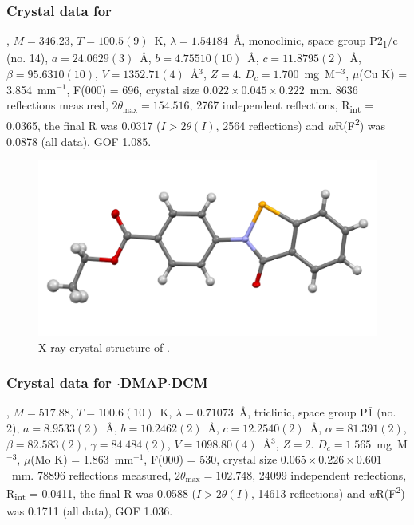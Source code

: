 \begin{refsection}
\subsubsection{Crystal data for \texorpdfstring{}{C16 H13 N O3 Se}}
, $M=346.23$, $T=100.5(9)$~K, $\lambda=1.54184$~\AA, monoclinic, space group P2\textsubscript{1}/c (no. 14), $a = 24.0629(3)$~\AA, $b = 4.75510(10)$~\AA, $c = 11.8795(2)$~\AA, $\beta = 95.6310(10)$\degree, $V = 1352.71(4)$~\AA$^{3}$, $Z = 4$. $D_{c}= 1.700$~mg~M$^{-3}$, $\mu$(Cu K\a) = 3.854~mm$^{-1}$, F(000) = 696, crystal size $0.022 \times 0.045 \times 0.222$~mm. 8636 reflections measured, $2\theta_{\max}=154.516$\degree, 2767 independent reflections, R\textsubscript{int} = 0.0365, the final R was 0.0317 ($I > 2\theta(I)$, 2564 reflections) and \textit{w}R(F\textsuperscript{2}) was 0.0878 (all data), GOF 1.085.

\begin{figure}
  \includegraphics[width=0.6\linewidth]{Figures/ebs-4co2et-xtal.pdf}
  \caption{X-ray crystal structure of \texorpdfstring{}{C16 H13 N O3 Se}.}
\end{figure}

\subsubsection{Crystal data for \texorpdfstring{$ \cdot $DMAP$ \cdot $DCM}{C24 H25 Cl N3 O3 Se}}
, $M=517.88$, $T=100.6(10)$~K, $ \lambda=0.71073 $~\AA, triclinic, space group P$\bar{1}$ (no. 2), $a = 8.9533(2)$~\AA, $b = 10.2462(2)$~\AA, $c = 12.2540(2)$~\AA, $\alpha = 81.391(2)$\degree, $\beta = 82.583(2)$\degree, $\gamma = 84.484(2)$\degree, $V = 1098.80(4)$~\AA$^{3}$, $Z = 2$. $D_{c}= 1.565$~mg~M$^{-3}$, $\mu$(Mo K\a) = 1.863~mm$^{-1}$, F(000) = 530, crystal size $0.065 \times 0.226 \times 0.601$~mm. 78896 reflections measured, $2\theta_{\max}=102.748$\degree, 24099 independent reflections, R\textsubscript{int} = 0.0411, the final R was 0.0588 ($I > 2\theta(I)$, 14613 reflections) and \textit{w}R(F\textsuperscript{2}) was 0.1711 (all data), GOF 1.036.


\end{refsection}
